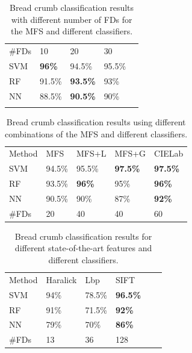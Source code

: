 \documentclass[spanish,a4paper,11pt,oneside,links]{report}
\begin{document}
\begin{table}[h!]
\caption{Bread crumb classification results with different number of FDs for the MFS and different classifiers.}
\label{tab:number}       %
\begin{tabular}{lllll}
\hline\noalign{\smallskip}
\#FDs & 10  & 20 & 30 \\
\noalign{\smallskip}\hline\noalign{\smallskip}
SVM & \textbf{96\%} & 94.5\% & 95.5\% \\
RF  & 91.5\% & \textbf{93.5\%} & 93\% \\
NN & 88.5\% & \textbf{90.5\%} & 90\% \\
\noalign{\smallskip}\hline
\end{tabular}
\end{table}


\begin{table}[h!]
\caption{Bread crumb classification results using different combinations of the MFS and different classifiers.}
\label{tab:mfs}       %
\begin{tabular}{lllll}
\hline\noalign{\smallskip}
Method & MFS & MFS+L & MFS+G & CIELab  \\
\noalign{\smallskip}\hline\noalign{\smallskip}
SVM & 94.5\% & 95.5\% & \textbf{97.5\%} & \textbf{97.5\%} \\
RF  & 93.5\% & \textbf{96\%} & 95\% & \textbf{96\%} \\
NN & 90.5\% & 90\% & 87\% & \textbf{92\%} \\
\noalign{\smallskip}\hline
\#FDs & 20 & 40 & 40 & 60 \\
\hline
\end{tabular}
\end{table}

\begin{table}[h!]
\caption{Bread crumb classification results for different state-of-the-art features and different classifiers.}
\label{tab:other}       %
\begin{tabular}{llllll}
\hline\noalign{\smallskip}
Method & Haralick & Lbp & SIFT\\ %
\noalign{\smallskip}\hline\noalign{\smallskip}
SVM & 94\% & 78.5\% & \textbf{96.5\%} \\ %
RF  & 91\% & 71.5\% & \textbf{92\%} \\ %
NN & 79\% & 70\% & \textbf{86\%} \\ %
\noalign{\smallskip}\hline
\#FDs & 13 & 36 & 128 \\
\hline
\end{tabular}
\end{table}
\end{document}
